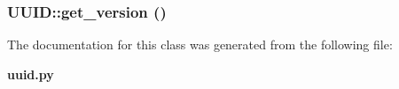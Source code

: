 \subsubsection{\setlength{\rightskip}{0pt plus 5cm}UUID::get\_\-version ()}\label{classUUID_UUIDa20}




The documentation for this class was generated from the following file:\begin{CompactItemize}
\item 
{\bf uuid.py}\end{CompactItemize}
